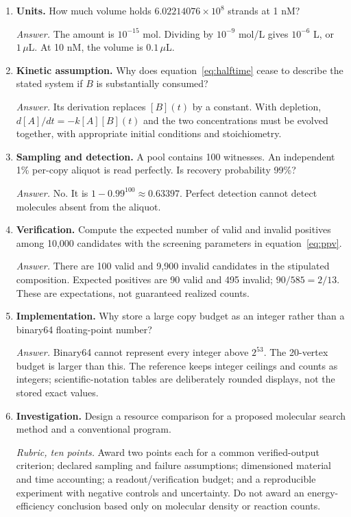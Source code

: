 \begin{enumerate}
\item \textbf{Units.} How much volume holds $6.02214076\times10^8$ strands at 1 nM?\par
\textit{Answer.} The amount is $10^{-15}$ mol. Dividing by $10^{-9}$ mol/L gives $10^{-6}$ L, or $1\,\mu$L. At 10 nM, the volume is $0.1\,\mu$L.

\item \textbf{Kinetic assumption.} Why does equation~\ref{eq:halftime} cease to describe the stated system if $B$ is substantially consumed?\par
\textit{Answer.} Its derivation replaces $[B](t)$ by a constant. With depletion, $d[A]/dt=-k[A][B](t)$ and the two concentrations must be evolved together, with appropriate initial conditions and stoichiometry.

\item \textbf{Sampling and detection.} A pool contains 100 witnesses. An independent 1\% per-copy aliquot is read perfectly. Is recovery probability 99\%?\par
\textit{Answer.} No. It is $1-0.99^{100}\approx0.63397$. Perfect detection cannot detect molecules absent from the aliquot.

\item \textbf{Verification.} Compute the expected number of valid and invalid positives among 10,000 candidates with the screening parameters in equation~\ref{eq:ppv}.\par
\textit{Answer.} There are 100 valid and 9,900 invalid candidates in the stipulated composition. Expected positives are 90 valid and 495 invalid; $90/585=2/13$. These are expectations, not guaranteed realized counts.

\item \textbf{Implementation.} Why store a large copy budget as an integer rather than a binary64 floating-point number?\par
\textit{Answer.} Binary64 cannot represent every integer above $2^{53}$. The 20-vertex budget is larger than this. The reference keeps integer ceilings and counts as integers; scientific-notation tables are deliberately rounded displays, not the stored exact values.

\item \textbf{Investigation.} Design a resource comparison for a proposed molecular search method and a conventional program.\par
\textit{Rubric, ten points.} Award two points each for a common verified-output criterion; declared sampling and failure assumptions; dimensioned material and time accounting; a readout/verification budget; and a reproducible experiment with negative controls and uncertainty. Do not award an energy-efficiency conclusion based only on molecular density or reaction counts.
\end{enumerate}

